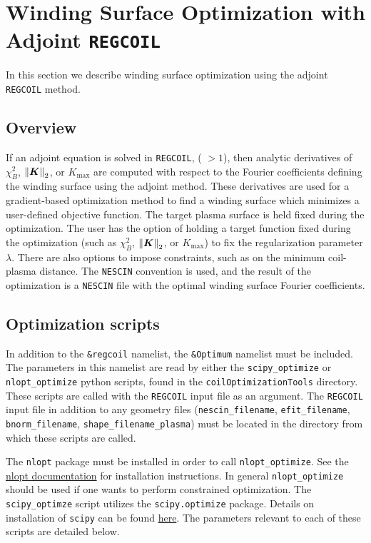 \myhrule

\chapter{Winding Surface Optimization with Adjoint \texttt{REGCOIL}}
\label{ch:adjoint}

In this section we describe winding surface optimization using the adjoint \texttt{REGCOIL} method. 

\section{Overview}

If an adjoint equation is solved in \texttt{REGCOIL}, ( $> 1$), then analytic derivatives of $\chi^2_B$, $\norm{\bm{K}}_2$, or $K_{\max}$ are computed with respect to the Fourier coefficients defining the winding surface using the adjoint method. These derivatives are used for a gradient-based optimization method to find a winding surface which minimizes a user-defined objective function. The target plasma surface is held fixed during the optimization. The user has the option of holding a target function fixed during the optimization (such as $\chi^2_B$, $\norm{\bm{K}}_2$, or $K_{\max}$) to fix the regularization parameter $\lambda$. There are also options to impose constraints, such as on the minimum coil-plasma distance. The \texttt{NESCIN} convention is used, and the result of the optimization is a \texttt{NESCIN} file with the optimal winding surface Fourier coefficients. 

\section{Optimization scripts}
In addition to the \texttt{\&regcoil} namelist, the \texttt{\&Optimum} namelist must be included. The parameters in this namelist are read by either the \texttt{scipy\_optimize} or \texttt{nlopt\_optimize} python scripts, found in the \texttt{coilOptimizationTools} directory. These scripts are called with the \texttt{REGCOIL} input file as an argument. The \texttt{REGCOIL} input file in addition to any geometry files (\texttt{nescin\_filename}, \texttt{efit\_filename}, \texttt{bnorm\_filename}, \texttt{shape\_filename\_plasma}) must be located in the directory from which these scripts are called. 

The \texttt{nlopt} package must be installed in order to call \texttt{nlopt\_optimize}. See the \href{https://nlopt.readthedocs.io/en/latest/#download-and-installation}{nlopt documentation} for installation instructions. In general \texttt{nlopt\_optimize} should be used if one wants to perform constrained optimization. The \texttt{scipy\_optimze} script utilizes the \texttt{scipy.optimize} package. Details on installation of \texttt{scipy} can be found \href{https://scipy.org/install.html}{here}. The parameters relevant to each of these scripts are detailed below. 

